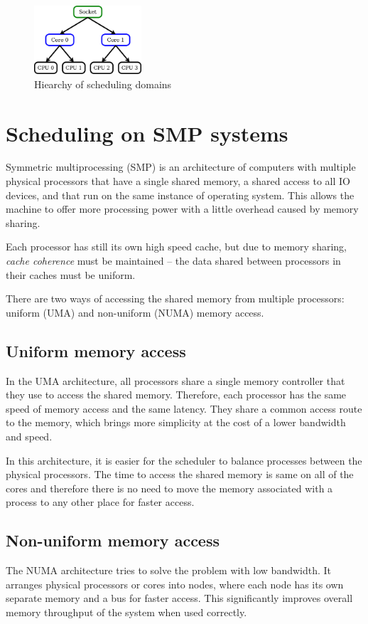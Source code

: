 \begin{figure}
  \centering
  \includegraphics[width=4cm]{obrazky-figures/sched-domains}
  \caption{Hiearchy of scheduling domains}
  \label{fig:sched-dom}
\end{figure}

\section{Scheduling on SMP systems}
Symmetric multiprocessing (SMP) is an architecture of computers with multiple
physical processors that have a single shared memory, a shared access to all IO
devices, and that run on the same instance of operating system. This allows the
machine to offer more processing power with a little overhead caused by memory
sharing.

Each processor has still its own high speed cache, but due to memory sharing,
\emph{cache coherence} must be maintained -- the data shared between processors
in their caches must be uniform.

There are two ways of accessing the shared memory from multiple processors:
uniform (UMA) and non-uniform (NUMA) memory access.

\subsection{Uniform memory access}
In the UMA architecture, all processors share a single memory controller that
they use to access the shared memory. Therefore, each processor has the same
speed of memory access and the same latency. They share a common access route to
the memory, which brings more simplicity at the cost of a lower bandwidth and
speed.

In this architecture, it is easier for the scheduler to balance processes
between the physical processors. The time to access the shared memory is same on
all of the cores and therefore there is no need to move the memory associated
with a process to any other place for faster access.

\subsection{Non-uniform memory access}
The NUMA architecture tries to solve the problem with low bandwidth.
It arranges physical processors or cores into nodes, where each node has its
own separate memory and a bus for faster access. This significantly improves
overall memory throughput of the system when used correctly.

